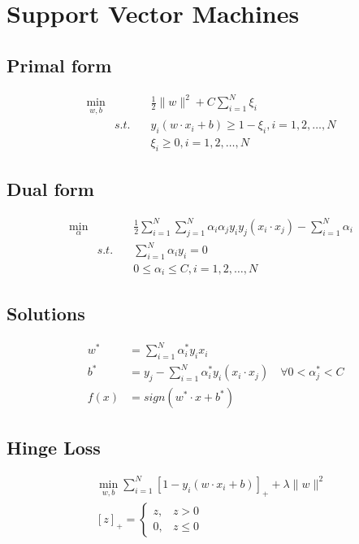 \chapter{Support Vector Machines}
\label{chap:SVM}
\section{Primal form}
\begin{eqnarray}
      \min_{w,b}  && \frac{1}{2}\|w\|^2 + C \sum\limits_{i=1}^N\xi_i\\
       & s.t. \quad&y_i(w \cdot x_i+b)\geqslant 1-\xi_i, i=1,2, \dots , N\\
                  &&\xi_i \geqslant 0, i=1,2, \dots, N
\end{eqnarray}
\section{Dual form}
\begin{eqnarray}
 \min_{\alpha} && \frac{1}{2} \sum\limits_{i=1}^N\sum\limits_{j=1}^N \alpha_i\alpha_j y_i y_j (x_i \cdot x_j) - \sum\limits_{i=1}^N \alpha_i \\
               & s.t.  \quad &\sum\limits_{i=1}^N\alpha_i y_i=0 \\
               && 0 \leqslant  \alpha_i \leqslant C, i=1,2, \dots, N
\end{eqnarray}
\section{Solutions}
\begin{eqnarray}
&w^*  & = \sum_{i=1}^N \alpha_i^* y_i x_i\\
&b^*  & = y_j - \sum_{i=1}^N \alpha_i^* y_i (x_i \cdot x_j) \quad \forall 0 < \alpha_j^* < C\\
&f(x) & = sign(w^* \cdot x + b^*)
\end{eqnarray}
\section{Hinge Loss}
\begin{eqnarray}
\min_{w,b} \sum\limits_{i=1}^N{[1-y_i(w \cdot x_i + b)]}_+ + \lambda\|w\|^2\\
{[z]}_+ = \begin{cases}
z,  & z > 0 \\
0,  & z \leqslant 0
\end{cases}
\end{eqnarray} 